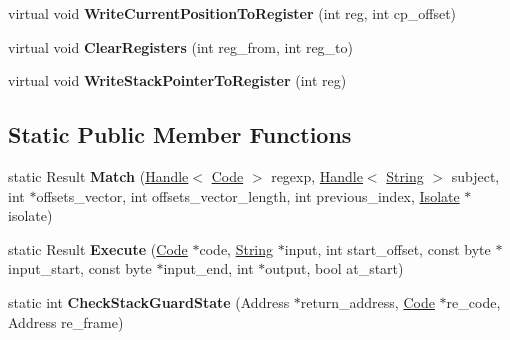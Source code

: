 \begin{DoxyCompactItemize}
\item 
virtual void {\bfseries Write\+Current\+Position\+To\+Register} (int reg, int cp\+\_\+offset)\hypertarget{classv8_1_1internal_1_1_reg_exp_macro_assembler_x64_a6f43d0a26de41fc192f34d8010c53a32}{}\label{classv8_1_1internal_1_1_reg_exp_macro_assembler_x64_a6f43d0a26de41fc192f34d8010c53a32}

\item 
virtual void {\bfseries Clear\+Registers} (int reg\+\_\+from, int reg\+\_\+to)\hypertarget{classv8_1_1internal_1_1_reg_exp_macro_assembler_x64_a4e9b070f91252a0ad737eab55250f44a}{}\label{classv8_1_1internal_1_1_reg_exp_macro_assembler_x64_a4e9b070f91252a0ad737eab55250f44a}

\item 
virtual void {\bfseries Write\+Stack\+Pointer\+To\+Register} (int reg)\hypertarget{classv8_1_1internal_1_1_reg_exp_macro_assembler_x64_afbd31733cfe7f9d4d7d27ea75b77b8ed}{}\label{classv8_1_1internal_1_1_reg_exp_macro_assembler_x64_afbd31733cfe7f9d4d7d27ea75b77b8ed}

\end{DoxyCompactItemize}
\subsection*{Static Public Member Functions}
\begin{DoxyCompactItemize}
\item 
static Result {\bfseries Match} (\hyperlink{classv8_1_1internal_1_1_handle}{Handle}$<$ \hyperlink{classv8_1_1internal_1_1_code}{Code} $>$ regexp, \hyperlink{classv8_1_1internal_1_1_handle}{Handle}$<$ \hyperlink{classv8_1_1internal_1_1_string}{String} $>$ subject, int $\ast$offsets\+\_\+vector, int offsets\+\_\+vector\+\_\+length, int previous\+\_\+index, \hyperlink{classv8_1_1internal_1_1_isolate}{Isolate} $\ast$isolate)\hypertarget{classv8_1_1internal_1_1_reg_exp_macro_assembler_x64_a82d14dc85b90fb7a573ac25831ff57ba}{}\label{classv8_1_1internal_1_1_reg_exp_macro_assembler_x64_a82d14dc85b90fb7a573ac25831ff57ba}

\item 
static Result {\bfseries Execute} (\hyperlink{classv8_1_1internal_1_1_code}{Code} $\ast$code, \hyperlink{classv8_1_1internal_1_1_string}{String} $\ast$input, int start\+\_\+offset, const byte $\ast$input\+\_\+start, const byte $\ast$input\+\_\+end, int $\ast$output, bool at\+\_\+start)\hypertarget{classv8_1_1internal_1_1_reg_exp_macro_assembler_x64_ac1604850aa044a74c1ad2011f29257e8}{}\label{classv8_1_1internal_1_1_reg_exp_macro_assembler_x64_ac1604850aa044a74c1ad2011f29257e8}

\item 
static int {\bfseries Check\+Stack\+Guard\+State} (Address $\ast$return\+\_\+address, \hyperlink{classv8_1_1internal_1_1_code}{Code} $\ast$re\+\_\+code, Address re\+\_\+frame)\hypertarget{classv8_1_1internal_1_1_reg_exp_macro_assembler_x64_ae06b1d96cbad2ced27ce62a5949607da}{}\label{classv8_1_1internal_1_1_reg_exp_macro_assembler_x64_ae06b1d96cbad2ced27ce62a5949607da}

\end{DoxyCompactItemize}
